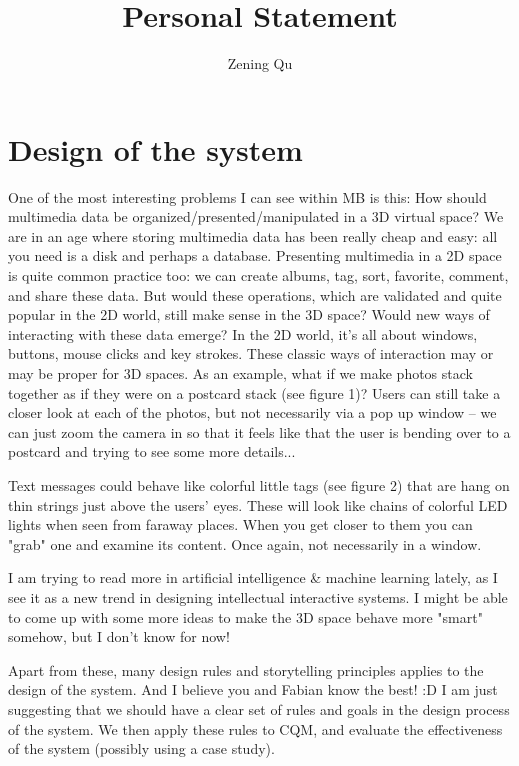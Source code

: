 \documentclass{article}
\begin{document}
\title{Personal Statement}
\author{Zening Qu}
\maketitle

\section{Design of the system}


One of the most interesting problems I can see within MB is this: How should multimedia data be organized/presented/manipulated in a 3D virtual space? We are in an age where storing multimedia data has been really cheap and easy: all you need is a disk and perhaps a database. Presenting multimedia in a 2D space is quite common practice too: we can create albums, tag, sort, favorite, comment, and share these data. But would these operations, which are validated and quite popular in the 2D world, still make sense in the 3D space? Would new ways of interacting with these data emerge? In the 2D world, it's all about windows, buttons, mouse clicks and key strokes. These classic ways of interaction may or may be proper for 3D spaces. As an example, what if we make photos stack together as if they were on a postcard stack (see figure 1)? Users can still take a closer look at each of the photos, but not necessarily via a pop up window -- we can just zoom the camera in so that it feels like that the user is bending over to a postcard and trying to see some more details...

Text messages could behave like colorful little tags (see figure 2) that are hang on thin strings just above the users' eyes. These will look like chains of colorful LED lights when seen from faraway places. When you get closer to them you can "grab" one and examine its content. Once again, not necessarily in a window.

I am trying to read more in artificial intelligence \& machine learning lately, as I see it as a new trend in designing intellectual interactive systems. I might be able to come up with some more ideas to make the 3D space behave more "smart" somehow, but I don't know for now!

Apart from these, many design rules and storytelling principles applies to the design of the system. And I believe you and Fabian know the best! :D I am just suggesting that we should have a clear set of rules and goals in the design process of the system. We then apply these rules to CQM, and evaluate the effectiveness of the system (possibly using a case study).
\end{document}
